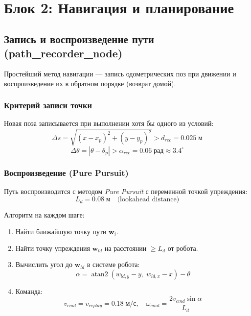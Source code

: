 \documentclass[12pt, a4paper]{article}
\begin{document}
\newpage
\section{Блок 2: Навигация и планирование}
\label{sec:nav}

\subsection{Запись и воспроизведение пути (path\_recorder\_node)}
\label{sec:path_recorder}

Простейший метод навигации — запись одометрических поз при движении и воспроизведение их в обратном порядке (возврат домой).

\subsubsection{Критерий записи точки}
Новая поза записывается при выполнении хотя бы одного из условий:
\begin{equation}
  \Delta s = \sqrt{(x-x_p)^2 + (y-y_p)^2} > d_{rec} = 0.025\;\text{м}
\end{equation}
\begin{equation}
  \Delta\theta = |\theta - \theta_p| > \alpha_{rec} = 0.06\;\text{рад} \approx 3.4^\circ
\end{equation}

\subsubsection{Воспроизведение (Pure Pursuit)}
Путь воспроизводится с методом \textit{Pure Pursuit} с переменной точкой упреждения:
\begin{equation}
  L_d = 0.08\;\text{м} \quad \text{(lookahead distance)}
\end{equation}

Алгоритм на каждом шаге:
\begin{enumerate}[noitemsep]
  \item Найти ближайшую точку пути $\mathbf{w}_i$.
  \item Найти точку упреждения $\mathbf{w}_{ld}$ на расстоянии $\geq L_d$ от робота.
  \item Вычислить угол до $\mathbf{w}_{ld}$ в системе робота:
    \[
      \alpha = \operatorname{atan2}(w_{ld,y} - y,\; w_{ld,x} - x) - \theta
    \]
  \item Команда:
    \[
      v_{cmd} = v_{replay} = 0.18\;\text{м/с}, \quad
      \omega_{cmd} = \frac{2v_{cmd}\sin\alpha}{L_d}
    \]
\end{enumerate}
\end{document}
